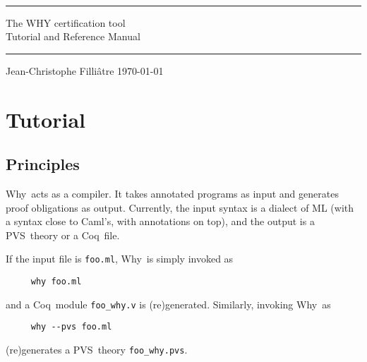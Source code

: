 \documentclass[a4paper,12pt]{report}
\newcommand{\caml}{\textsf{Caml}}
\newcommand{\pvs}{\textsf{PVS}}
\newcommand{\coq}{\textsf{Coq}}
\newcommand{\why}{\textsf{Why}}
\begin{document}
\thispagestyle{empty}
\begin{center}
~\\[3cm]
\rule\textwidth{0.1cm}\\[0.5cm]
{\Huge\sf The WHY certification tool}\\[1cm]
{\Large\sf Tutorial and Reference Manual}\\[0.1cm]
\rule\textwidth{0.1cm}\\[3cm]
Jean-Christophe Filli\^atre
\vfill
\today\\
\end{center}


\tableofcontents





\chapter{Tutorial}
\label{tutorial}


\section{Principles}

\why\ acts as a compiler. It takes annotated programs as input and
generates proof obligations as output.
Currently, the input syntax is a dialect of ML (with a syntax close to
\caml's, with annotations on top),
and the output is a \pvs\ theory or a \coq\ file.

If the input file is \texttt{foo.ml}, \why\ is simply invoked as
\begin{verbatim}
     why foo.ml
\end{verbatim}
and a \coq\ module \texttt{foo\_why.v} is (re)generated.
Similarly, invoking \why\ as
\begin{verbatim}
     why --pvs foo.ml
\end{verbatim}
(re)generates a \pvs\ theory \texttt{foo\_why.pvs}.
\end{document}

